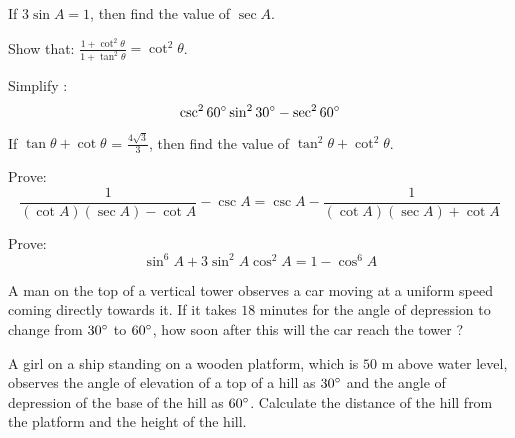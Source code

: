 		\hfill{}\item If $3\sin A = 1$, then find the value of $\sec A$.
		\hfill{}\item Show that: $\frac{1 + \cot^2{\theta}}{1 + \tan^2{\theta}} = \cot^2{\theta}$.
\hfill{}\item Simplify :$${\csc^{2}{60\degree} \sin^{2}{30\degree} - \sec^{2}{60\degree}}$$
	\hfill{}\item If $\tan{\theta} + \cot{\theta}$ = $\frac{4 \sqrt{3}}{3}$, then find the value of $\tan^{2}{\theta} + \cot^{2}{\theta}$. 
		\hfill{}\item Prove:$$\frac{1}{(\cot A)(\sec A) - \cot A} - \csc A = \csc A - \frac{1}{(\cot A)(\sec A) + \cot A}$$
		\hfill{}\item Prove:$$\sin^{6} A + 3\sin^{2} A \cos^{2} A = 1 - \cos^{6}  A$$
		\hfill{}\item A man on the top of a vertical tower observes a car moving at a uniform speed coming directly towards it. If it takes $18$ minutes for the angle of depression to change from $30\degree$ to $60\degree$, how soon after this will the car reach the tower ?

		\hfill{}\item A girl on a ship standing on a wooden platform, which is $50$ m above water level, observes the angle of elevation of a top of a hill as $30\degree$ and the angle of depression of the base of the hill as $60\degree$. Calculate the distance of the hill from the platform and the height of the hill.
\hfill{}
